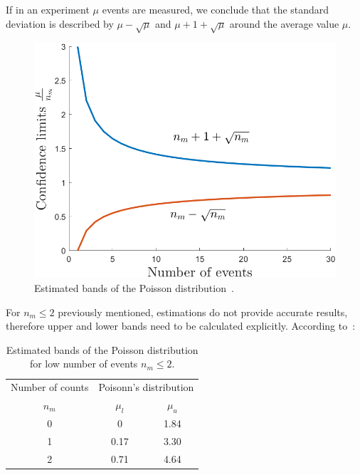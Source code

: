 If in an experiment $\mu$ events are measured, we conclude that the standard deviation is described by $\mu - \sqrt{\mu}$ and $\mu + 1 + \sqrt{\mu}$ around the average value $\mu$.

\begin{figure}[!h]
    \centering
    \includegraphics[width=0.55\columnwidth]{Chapter4/images/poisson.png}
    \caption{Estimated bands of the Poisson distribution~\cite{schmidt}.}
    \label{fig:poisson}
\end{figure}
\newpage

For $n_{m} \leq 2$ previously mentioned, estimations do not provide accurate results, therefore upper and lower bands need to be calculated explicitly. According to~\cite{schmidt}:



\begin{table}[!h]
\centering
\caption{Estimated bands of the Poisson distribution for low number of events $n_{m}  \leq 2$.}
\begin{tabular}{ccc}
\hline
Number of counts & \multicolumn{2}{c}{Poisonn's distribution} \\ \cline{2-3} 
$n_{m}$          & $\mu_{l}$            & $\mu_{u}$           \\ \hline
0                & 0                    & 1.84                \\
1                & 0.17                & 3.30                \\
2                & 0.71                & 4.64                \\ \hline
\end{tabular}
\end{table}
